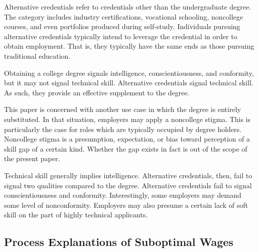 \documentclass[review]{elsarticle}
\begin{document}
Alternative credentials refer to credentials other than the undergraduate degree\cite{brown2017complex}.
The category includes industry certifications,
vocational schooling, noncollege courses,
and even portfolios produced during self-study.
Individuals pursuing alternative credentials typically intend to leverage the credential in order to obtain employment.
That is, they typically have the same ends as those pursuing traditional education.

Obtaining a college degree signals intelligence, conscientiousness, and conformity,
but it may not signal technical skill\cite{horton_2020}.
Alternative credentials signal technical skill.
As such, they provide an effective supplement to the degree.

This paper is concerned with another use case in which the degree is entirely substituted.
In that situation, employers may apply a noncollege stigma.
This is particularly the case for roles which are typically occupied by degree holders.
Noncollege stigma is a presumption, expectation, or bias toward perception of a skill gap of a certain kind.
Whether the gap exists in fact is out of the scope of the present paper.

Technical skill generally implies intelligence.
Alternative credentials, then, fail to signal two qualities compared to the degree.
Alternative credentials fail to signal conscientiousness and conformity.
Interestingly, some employers may demand some level of nonconformity.
Employers may also presume a certain lack of soft skill on the part of highly technical applicants.


\subsection{Process Explanations of Suboptimal Wages}
\end{document}

